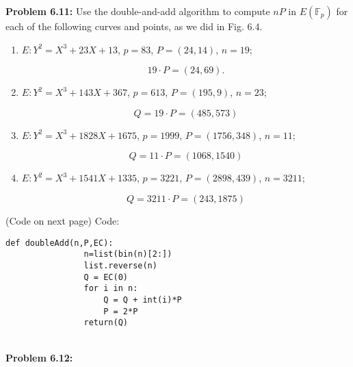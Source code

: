 \documentclass[a4paper, 11pt]{article}
\begin{document}
\noindent\textbf{Problem 6.11:}
    \singlespacing
    Use the double-and-add algorithm to compute $nP$ in $E(\mathbb{F}_p)$ for each of the following curves and points, as we did in Fig. 6.4.
    \begin{enumerate}[label=(\alph*)]
        \item $E:Y^2=X^3+23X+13$, \qquad $p=83$, \qquad $P=(24,14)$, \qquad $n=19$;
        
        $$19\cdot P = (24,69).$$
        
        \item $E:Y^2=X^3+143X+367$, \qquad $p=613$, \qquad $P=(195,9)$, \qquad $n=23$;
        
        $$Q = 19\cdot P = (485, 573)$$
        
        \item $E:Y^2=X^3+1828X+1675$, \qquad $p=1999$, \qquad $P=(1756,348)$, \qquad $n=11$;
        
        $$Q = 11\cdot P = (1068, 1540)$$
        
        \item $E:Y^2=X^3+1541X+1335$, \qquad $p=3221$, \qquad $P=(2898,439)$, \qquad $n=3211$;
        
        $$Q = 3211\cdot P = (243, 1875)$$
    
    \end{enumerate}
    (Code on next page)
    \newpage
    Code:
            \begin{lstlisting}[style = Python]
                def doubleAdd(n,P,EC):
                n=list(bin(n)[2:])
                list.reverse(n)
                Q = EC(0)
                for i in n:
                    Q = Q + int(i)*P
                    P = 2*P
                return(Q)
        \end{lstlisting}\\
\noindent\textbf{Problem 6.12:}
    
\end{document}
